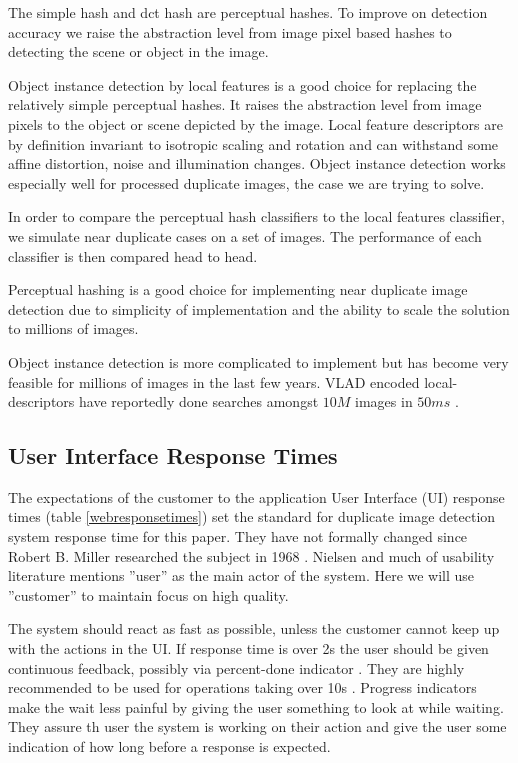 \documentclass[english,12pt,a4paper,pdftex,elec,utf8]{aaltothesis}
\begin{document}
The simple hash and dct hash are perceptual hashes. To improve on detection accuracy we raise the abstraction level from image pixel based hashes to detecting the scene or object in the image.

Object instance detection by local features is a good choice for replacing the relatively simple perceptual hashes. It raises the abstraction level from image pixels to the object or scene depicted by the image. Local feature descriptors are by definition invariant to isotropic scaling and rotation and can withstand some affine distortion, noise and illumination changes. Object instance detection works especially well for processed duplicate images, the case we are trying to solve.

In order to compare the perceptual hash classifiers to the local features classifier, we simulate near duplicate cases on a set of images. The performance of each classifier is then compared head to head.

Perceptual hashing is a good choice for implementing near duplicate image detection due to simplicity of implementation and the ability to scale the solution to millions of images.

Object instance detection is more complicated to implement but has become very feasible for millions of images in the last few years. VLAD encoded local-descriptors have reportedly done searches amongst $10M$ images in $50ms$ \cite{Jegou2010}.

\subsection{User Interface Response Times}
The expectations of the customer to the application User Interface (UI) response times (table \ref{webresponsetimes}) set the standard for duplicate image detection system response time for this paper. They have not formally changed since Robert B. Miller researched the subject in 1968 \cite{Nielsen1993}. Nielsen and much of usability literature mentions ''user'' as the main actor of the system. Here we will use ''customer'' to maintain focus on high quality.

The system should react as fast as possible, unless the customer cannot keep up with the actions in the UI. If response time is over 2s the user should be given continuous feedback, possibly via percent-done indicator \cite{Myers1985}. They are highly recommended to be used for operations taking over 10s \cite{Nielsen1993}. Progress indicators make the wait less painful by giving the user something to look at while waiting. They assure th user the system is working on their action and give the user some indication of how long before a response is expected. \cite{Nielsen1993a}
\end{document}
